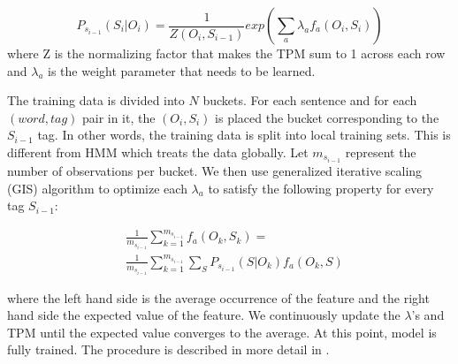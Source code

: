 \vspace{-1em}
\begin{equation}
P_{s_{i-1}}(S_i | O_i) = \frac{1}{Z(O_i, S_{i-1})} exp(\sum\limits_{a}\lambda_a f_a(O_i, S_i))
\end{equation}
where Z is the normalizing factor that makes the TPM sum to 1 across each row and $\lambda_a$ is the weight parameter that needs to be learned.

The training data is divided into $N$ buckets. For each sentence and for each $(word, tag)$ pair in it, the $(O_i, S_i)$ is placed the bucket corresponding to the $S_{i-1}$ tag. In other words, the training data is split into local training sets. This is different from HMM which treats the data globally. Let $m_{s_{i-1}}$ represent the number of observations per bucket. We then use generalized iterative scaling (GIS) algorithm to optimize each $\lambda_a$ to satisfy the following property for every tag $S_{i-1}$:

\begin{equation}
  \begin{split}
    &\frac{1}{m_{s_{i-1}}}\sum\limits_{k=1}^{m_{s_{i-1}}} f_a(O_k, S_k) = \\ &\frac{1}{m_{s_{i-1}}}\sum\limits_{k=1}^{m_{s_{i-1}}} \sum\limits_{S}P_{s_{i-1}}(S|O_k)f_a(O_k, S)
  \end{split}
\end{equation}


where the left hand side is the average occurrence of the feature and the right hand side the expected value of the feature. We continuously update the $\lambda$'s and TPM until the expected value converges to the average. At this point, model is fully trained. The procedure is described in more detail in \cite{memmPaper}.
